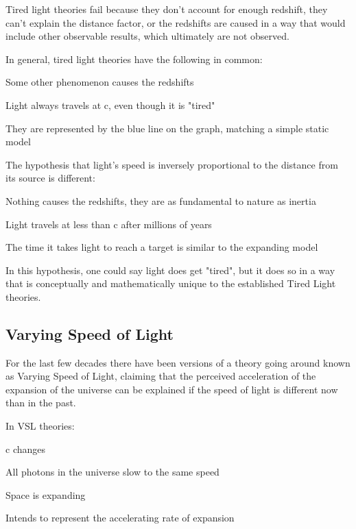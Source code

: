 \documentclass{ws-mpla}
\begin{document}
Tired light theories fail because they don't account for enough redshift, they can't explain the distance factor, or the redshifts are caused in a way that would include other observable results, which ultimately are not observed.

In general, tired light theories have the following in common:

\begin{itemlist}
 \item Some other phenomenon causes the redshifts 
 \item Light always travels at c, even though it is "tired" 
 \item They are represented by the blue line on the graph, matching a simple static model 
\end{itemlist}

The hypothesis that light's speed is inversely proportional to the distance from its source is different:

\begin{itemlist}
 \item Nothing causes the redshifts, they are as fundamental to nature as inertia 
 \item Light travels at less than c after millions of years 
 \item The time it takes light to reach a target is similar to the expanding model 
\end{itemlist}

In this hypothesis, one could say light does get "tired", but it does so in a way that is conceptually and mathematically unique to the established Tired Light theories.

\subsection{Varying Speed of Light}

For the last few decades there have been versions of a theory going around known as Varying Speed of Light, claiming that the
perceived acceleration of the expansion of the universe can be explained if the speed of light is different now than in the past.\cite{VSL}

In VSL theories:

\begin{itemlist}
 \item c changes 
 \item All photons in the universe slow to the same speed 
 \item Space is expanding 
 \item Intends to represent the accelerating rate of expansion 
\end{itemlist}
\end{document}
